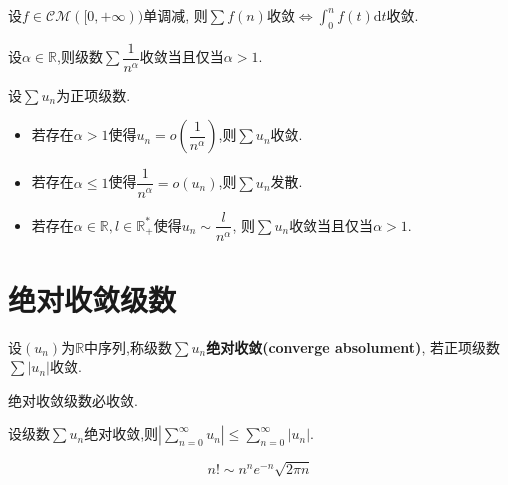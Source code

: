 \begin{prop}
    设$f \in \mathcal{CM}([0, + \infty))$单调减,
    则$\sum f(n)$收敛$\iff \int_0^{n} f(t) \mathrm{d}t$收敛.
\end{prop}

\begin{prop}
    设$\alpha \in \mathbb{R}$,则级数$\sum \dfrac{1}{n^{\alpha}}$收敛当且仅当$\alpha > 1$.
\end{prop}

\begin{prop}
    设$\sum u_n$为正项级数.
    \begin{itemize}
        \item 若存在$\alpha > 1$使得$u_n = o \left( \dfrac{1}{n^{\alpha}} \right)$,则$\sum u_n$收敛.
        \item 若存在$\alpha \leqslant 1$使得$\dfrac{1}{n^{\alpha}} = o(u_n)$,则$\sum u_n$发散.
        \item 若存在$\alpha \in \mathbb{R}, l \in \mathbb{R}_+^*$使得$u_n \sim \dfrac{l}{n^{\alpha}}$,
            则$\sum u_n$收敛当且仅当$\alpha > 1$.
    \end{itemize}
\end{prop}

\section{绝对收敛级数}

\begin{deff}
    设$(u_n)$为$\mathbb{R}$中序列,称级数$\sum u_n$\textbf{绝对收敛(converge absolument)},
    若正项级数$\sum \lvert u_n \rvert$收敛.
\end{deff}

\begin{thm}
    绝对收敛级数必收敛.
\end{thm}

\begin{prop}
    设级数$\sum u_n$绝对收敛,则$\left\lvert \sum\limits_{n = 0}^{\infty} u_n \right\rvert \leqslant 
    \sum\limits_{n = 0}^{\infty} \left\lvert u_n \right\rvert$.
\end{prop}

\begin{prop}[Stirling公式]
    \[ n! \sim n^n e^{-n} \sqrt{2 \pi n} \]
\end{prop}